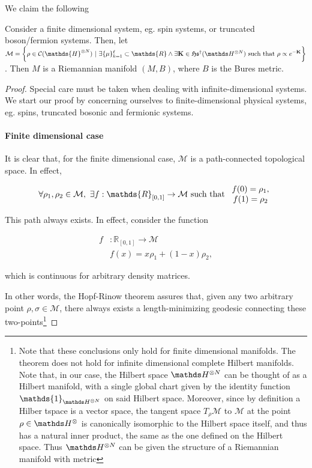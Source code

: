 \documentclass{homework}
\begin{document}
We claim the following

\begin{theo}
    Consider a finite dimensional system, eg. spin systems, or truncated boson/fermion systems. Then, let $\mathcal{M} = \bigg\{ \rho \in \mathcal{C}(\mathds{H}^{\otimes N}) \blanky | \blanky \exists \{\mu\}_{k=1}^{\ell} \subset \mathds{R} \land \exists {\bf K} \in \mathfrak{H}\mathfrak{s}^{\dagger}(\hilbert^{\otimes N}) \textnormal{ such that } \rho \propto e^{-{\bf K}} \bigg\}$. Then $M$ is a Riemannian manifold $(M, B)$, where $B$ is the Bures metric. 
\end{theo}

\begin{proof}

Special care must be taken when dealing with infinite-dimensional systems. We start our proof by concerning ourselves to finite-dimensional physical systems, eg. spins, truncated bosonic and fermionic systems. \\

\paragraph{\textbf{Finite dimensional case}}

It is clear that, for the finite dimensional case, $\mathcal{M}$ is a path-connected topological space. In effect, 

$$
    \forall \rho_1, \rho_2 \in \mathcal{M}, \blanky \exists f:\mathds{R}_{[0,1]} \rightarrow \mathcal{M} \textnormal{ such that } \begin{array}{c}
         f(0) = \rho_1, \\
         f(1) = \rho_2
    \end{array}
$$

This path always exists. In effect, consider the function 

\begin{align*}
    f&:\mathds{R}_{[0,1]} \rightarrow \mathcal{M} \\
    &f(x) = x \rho_1 + (1-x) \rho_2,
\end{align*}

which is continuous for arbitrary density matrices. 




In other words, the Hopf-Rinow theorem assures that, given any two arbitrary point $\rho, \sigma \in \mathcal{M}$, there always exists a length-minimizing geodesic connecting these two-points\footnote{Note that these conclusions only hold for finite dimensional manifolds. The theorem does not hold for infinite dimensional complete Hilbert manifolds. Note that, in our case, the Hilbert space $\hilbert^{\otimes N}$ can be thought of as a Hilbert manifold, with a single global chart given by the identity function $\mathds{1}_{\hilbert^{\otimes N}}$ on said Hilbert space. Moreover, since by definition a Hilber tspace is a vector space, the tangent space $T_{\rho} \mathcal{M}$ to $\mathcal{M}$ at the point $\rho \in \hilbert^{\otimes}$ is canonically isomorphic to the Hilbert space itself, and thus has a natural inner product, the same as the one defined on the Hilbert space. Thus $\hilbert^{\otimes N}$ can be given the structure of a Riemannian manifold with metric 

}
\end{proof}
\end{document}

